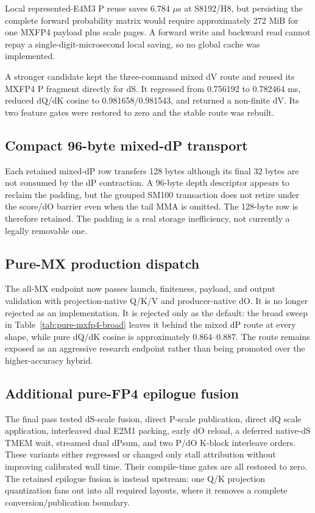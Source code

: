 Local represented-E4M3 P reuse saves 6.784 $\mu$s at S8192/H8, but persisting
the complete forward probability matrix would require approximately 272 MiB
for one MXFP4 payload plus scale pages.  A forward write and backward read
cannot repay a single-digit-microsecond local saving, so no global cache was
implemented.

A stronger candidate kept the three-command mixed dV route and reused its
MXFP4 P fragment directly for dS.  It regressed from 0.756192 to 0.782464 ms,
reduced dQ/dK cosine to 0.981658/0.981543, and returned a non-finite dV.  Its
two feature gates were restored to zero and the stable route was rebuilt.

\subsection{Compact 96-byte mixed-dP transport}

Each retained mixed-dP row transfers 128 bytes although its final 32 bytes are
not consumed by the dP contraction.  A 96-byte depth descriptor appears to
reclaim the padding, but the grouped SM100 transaction does not retire under
the score/dO barrier even when the tail MMA is omitted.  The 128-byte row is
therefore retained.  The padding is a real storage inefficiency, not currently
a legally removable one.

\subsection{Pure-MX production dispatch}

The all-MX endpoint now passes launch, finiteness, payload, and output
validation with projection-native Q/K/V and producer-native dO.  It is no
longer rejected as an implementation.  It is rejected only as the default:
the broad sweep in Table~\ref{tab:pure-mxfp4-broad} leaves it behind the mixed
dP route at every shape, while pure dQ/dK cosine is approximately
0.864--0.887.  The route remains exposed as an aggressive research endpoint
rather than being promoted over the higher-accuracy hybrid.

\subsection{Additional pure-FP4 epilogue fusion}

The final pass tested dS-scale fusion, direct P-scale publication, direct dQ
scale application, interleaved dual E2M1 packing, early dO reload, a deferred
native-dS TMEM wait, streamed dual dPsum, and two P/dO K-block interleave
orders.  These variants either regressed or changed only stall attribution
without improving calibrated wall time.  Their compile-time gates are all
restored to zero.  The retained epilogue fusion is instead upstream: one Q/K
projection quantization fans out into all required layouts, where it removes
a complete conversion/publication boundary.

